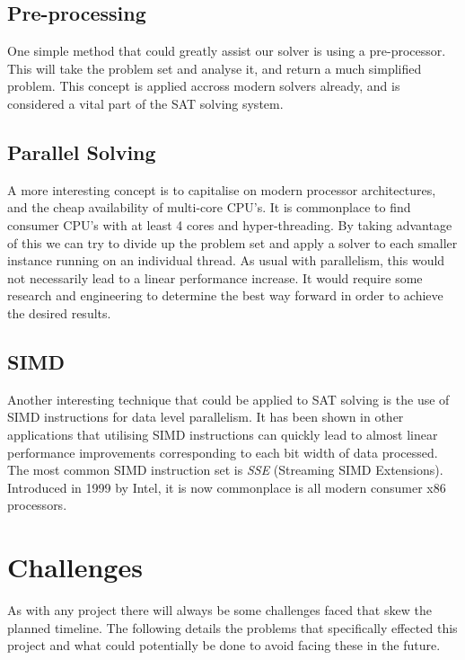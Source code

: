 \documentclass{article}
\begin{document}
\subsection{Pre-processing}
One simple method that could greatly assist our solver is using a pre-processor. This will take the problem set and analyse it, and return a much simplified problem. This concept is applied accross modern solvers already, and is considered a vital part of the SAT solving system.


\subsection{Parallel Solving}
A more interesting concept is to capitalise on modern processor architectures, and the cheap availability of multi-core CPU's. It is commonplace to find consumer CPU's with at least 4 cores and hyper-threading. By taking advantage of this we can try to divide up the problem set and apply a solver to each smaller instance running on an individual thread. As usual with parallelism, this would not necessarily lead to a linear performance increase. It would require some research and engineering to determine the best way forward in order to achieve the desired results.


\subsection{SIMD}
Another interesting technique that could be applied to SAT solving is the use of SIMD instructions for data level parallelism. It has been shown in other applications that utilising SIMD instructions can quickly lead to almost linear performance improvements corresponding to each bit width of data processed. The most common SIMD instruction set is \textit{SSE} (Streaming SIMD Extensions). Introduced in 1999 by Intel, it is now commonplace is all modern consumer x86 processors.


\section{Challenges}
As with any project there will always be some challenges faced that skew the planned timeline. The following details the problems
that specifically effected this project and what could potentially be done to avoid facing these in the future.
\end{document}
